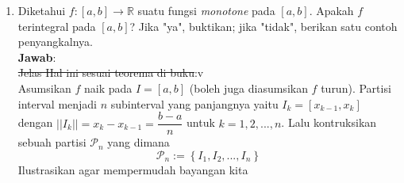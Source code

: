 \documentclass[10pt,openany,a4paper]{article}
\newcommand{\R}{\mathbb{R}}
\newcommand{\jawab}{\textbf{Jawab}:}
\begin{document}
\begin{enumerate}
    \item Diketahui $f:[a,b]\to\R$ suatu fungsi \textit{monotone} pada $[a,b]$. Apakah $f$ terintegral
    pada $[a,b]$? Jika "ya", buktikan; jika "tidak", berikan satu contoh penyangkalnya.\\
    \jawab\\
    \st{Jelas Hal ini sesuai teorema di buku}:v\\
    Asumsikan $f$ naik pada $I=[a,b]$ (boleh juga diasumsikan $f$ turun). Partisi interval menjadi
    $n$ subinterval yang panjangnya yaitu $I_k=[x_{k-1},x_k]$ dengan $||I_k||=x_k-x_{k-1}=\dfrac{b-a}{n}$ untuk $k=1,2,...,n$. 
    Lalu kontruksikan sebuah partisi $\mathcal{P}_n$ yang dimana
    \[\mathcal{P}_n:=\left\{I_1,I_2,...,I_n\right\}\]
    Ilustrasikan agar mempermudah bayangan kita
    \begin{center}
\end{center}
\end{enumerate}
\end{document}
